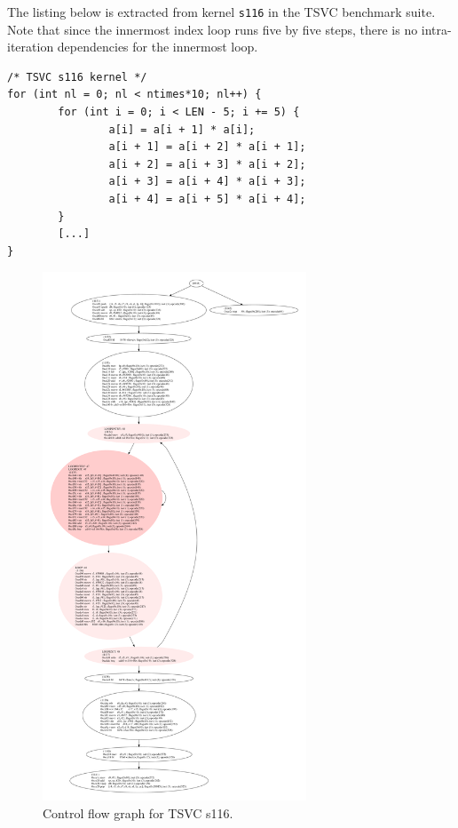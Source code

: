 \documentclass[11pt, a4paper, twoside]{montblanc2}
\begin{document}
The listing below is extracted from kernel \texttt{s116} in the TSVC benchmark
suite. Note that since the innermost index loop runs five by five steps, there is no
intra-iteration dependencies for the innermost loop.
\lstset{style=C}
\begin{lstlisting}
/* TSVC s116 kernel */
for (int nl = 0; nl < ntimes*10; nl++) {
        for (int i = 0; i < LEN - 5; i += 5) {
                a[i] = a[i + 1] * a[i];
                a[i + 1] = a[i + 2] * a[i + 1];
                a[i + 2] = a[i + 3] * a[i + 2];
                a[i + 3] = a[i + 4] * a[i + 3];
                a[i + 4] = a[i + 5] * a[i + 4];
        }
        [...]
}
\end{lstlisting}
\begin{figure}[p]
  \centering
\includegraphics[width=0.70\textwidth]{cfg_s116}
\caption{Control flow graph for TSVC s116.}\label{fig:cfgs116}
\end{figure}
\end{document}

